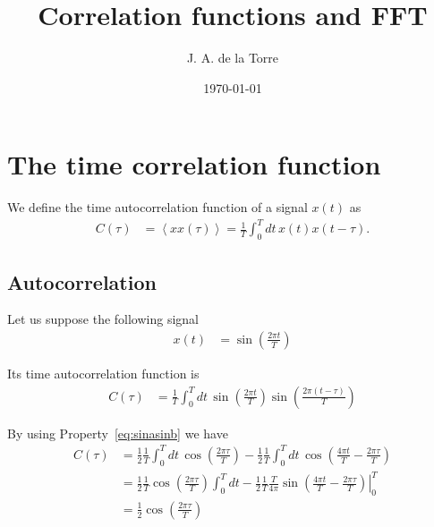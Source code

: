 \documentclass{article}
\title{Correlation functions and FFT}
\author{J. A. de la Torre}
\date{\today}
\begin{document}
\maketitle

\section{The time correlation function}
We define the time autocorrelation function of a signal $x(t)$ as
\begin{align}
  C(\tau) &= \left< x x(\tau)\right> = \frac{1}{T}\int_0^{T} dt\, x(t) x(t-\tau).
\end{align}

\subsection*{Autocorrelation}
Let us suppose the following signal
\begin{align}
  x(t)&= \sin \left( \frac{2 \pi t}{T} \right)
\end{align}

Its time autocorrelation function is
\begin{align}
  C(\tau) &= \frac{1}{T} \int_0^{T} dt\,\sin \left( \frac{2 \pi t}{T} \right)\sin \left( \frac{2 \pi (t-\tau)}{T} \right) 
\end{align}

By using Property~\ref{eq:sinasinb} we have
\begin{align}
  C(\tau) &= \frac{1}{2} \frac{1}{T} \int_0^T dt\, \cos \left(\frac{2 \pi \tau}{T} \right)
           - \frac{1}{2} \frac{1}{T} \int_0^T dt\, \cos \left(\frac{4 \pi t}{T} - \frac{2 \pi \tau}{T} \right) \\
           &=\frac{1}{2} \frac{1}{T} \cos \left(\frac{2\pi \tau}{T}\right)  \int_{0}^{T} dt
           - \frac{1}{2} \frac{1}{T} \left. \frac{T}{4\pi} \sin \left(\frac{4\pi t}{T} - \frac{2\pi \tau}{T}\right) \right|_{0}^{T} \\
           &= \frac{1}{2} \cos \left( \frac{2 \pi \tau}{T} \right)
\end{align}
\end{document}
